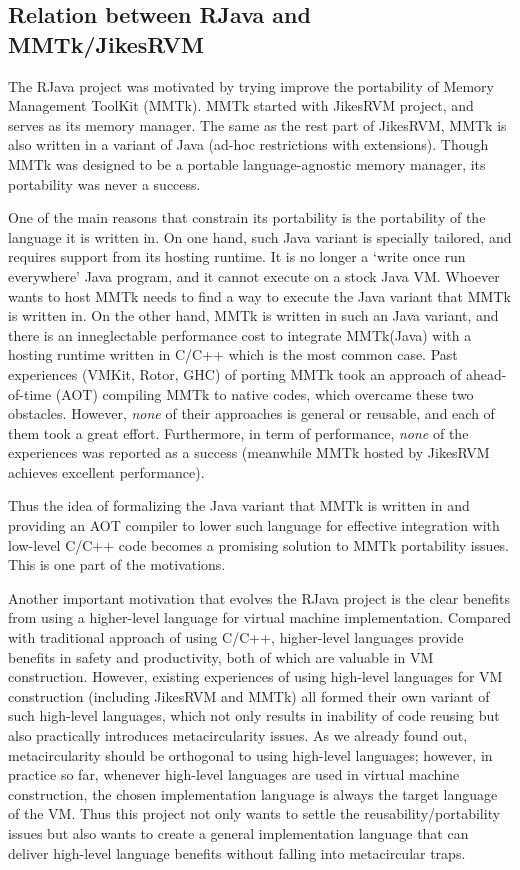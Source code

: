 \documentclass[12pt]{article}
\begin{document}
\subsection{Relation between RJava and MMTk/JikesRVM}

The RJava project was motivated by trying improve the portability of Memory Management
ToolKit (MMTk). MMTk started with JikesRVM project, and serves as its memory manager. 
The same as the rest part of JikesRVM, MMTk is also written in a variant of Java 
(ad-hoc restrictions with  extensions). 
Though MMTk was designed to be a portable language-agnostic memory manager, 
its portability was never a success. 

One of the main reasons that constrain its portability is the portability of the language it
is written in. On one hand, such Java variant is specially tailored, and requires support from 
its hosting runtime. It is no longer a `write once run everywhere' Java program, and
it cannot execute on a stock Java VM. Whoever wants to host MMTk needs to find a way
to execute the Java variant that MMTk is written in. 
On the other hand, MMTk is written in such an Java variant, and 
there is an inneglectable performance cost to integrate MMTk(Java) with a hosting runtime 
written in C/C++ which is the most common case. Past experiences (VMKit, Rotor, GHC)
of porting MMTk took an approach of ahead-of-time (AOT) compiling MMTk to native codes, which overcame
these two obstacles. However, \emph{none} of their approaches is general or reusable, and each
of them took a great effort. Furthermore, in term of performance, 
\emph{none} of the experiences was reported as a success (meanwhile MMTk hosted by JikesRVM
achieves excellent performance). 

Thus the idea of formalizing the Java variant that MMTk is written in 
and providing an AOT compiler to lower such language for effective
integration with low-level C/C++ code becomes a promising solution
to MMTk portability issues. This is one part of the motivations. 

Another important motivation that evolves the RJava project is the clear benefits
from using a higher-level language for virtual machine implementation. 
Compared with traditional approach of using C/C++, higher-level languages
provide benefits in safety and productivity, both of which are valuable in 
VM construction. However, existing experiences of using high-level languages
for VM construction (including JikesRVM and MMTk) all formed their own
variant of such high-level languages, which not only results in inability of code
reusing but also practically introduces metacircularity issues. As we 
already found out, metacircularity should be orthogonal to using high-level languages;
however, in practice so far, whenever high-level languages are used in virtual machine 
construction, the chosen implementation language is always the target language of 
the VM. Thus this project not only wants to settle the reusability/portability issues
but also wants to create a general implementation language
that can deliver high-level language benefits without falling into metacircular traps. 
\end{document}
